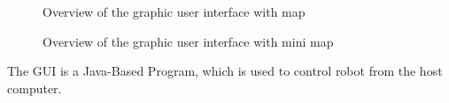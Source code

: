 \documentclass[11pt, a4paper]{report}
\begin{document}
\begin{figure}[ht]
\centering
\setlength\fboxsep{2pt}
\setlength\fboxrule{0.2pt}
\caption{Overview of the graphic user interface with map}
\label{sec:GUI}
\label{fig:GUI}
\end{figure}
\pagebreak
\begin{figure}[ht]
\centering
\setlength\fboxsep{2pt}
\setlength\fboxrule{0.2pt}
\caption{Overview of the graphic user interface with mini map}
\label{sec:GUI}
\label{fig:GUI}
\end{figure}
The GUI is a Java-Based Program, which is used to control robot from the host computer. 
\end{document}
